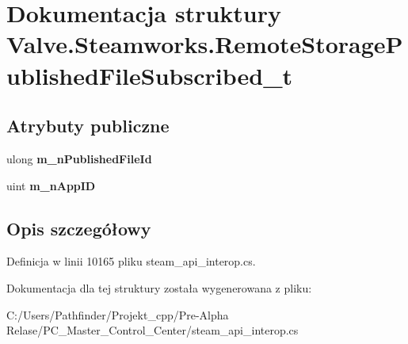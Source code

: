 \hypertarget{struct_valve_1_1_steamworks_1_1_remote_storage_published_file_subscribed__t}{}\section{Dokumentacja struktury Valve.\+Steamworks.\+Remote\+Storage\+Published\+File\+Subscribed\+\_\+t}
\label{struct_valve_1_1_steamworks_1_1_remote_storage_published_file_subscribed__t}
\subsection*{Atrybuty publiczne}
\begin{DoxyCompactItemize}
\item 
\mbox{\label{struct_valve_1_1_steamworks_1_1_remote_storage_published_file_subscribed__t_add7ce96642e1a6533ebb839a37ba8b98}} 
ulong {\bfseries m\+\_\+n\+Published\+File\+Id}
\item 
\mbox{\label{struct_valve_1_1_steamworks_1_1_remote_storage_published_file_subscribed__t_ab093ea8e945b9d7b5bc6a8ac8ac4d87a}} 
uint {\bfseries m\+\_\+n\+App\+ID}
\end{DoxyCompactItemize}


\subsection{Opis szczegółowy}


Definicja w linii 10165 pliku steam\+\_\+api\+\_\+interop.\+cs.



Dokumentacja dla tej struktury została wygenerowana z pliku\+:\begin{DoxyCompactItemize}
\item 
C\+:/\+Users/\+Pathfinder/\+Projekt\+\_\+cpp/\+Pre-\/\+Alpha Relase/\+P\+C\+\_\+\+Master\+\_\+\+Control\+\_\+\+Center/steam\+\_\+api\+\_\+interop.\+cs\end{DoxyCompactItemize}
